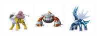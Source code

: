 \documentclass[12pt]{beamer}
\begin{document}
\begin{frame}
\begin{footnotesize}
\begin{block}{}
\begin{center}
    \includegraphics[width=1.5cm]{../../images/pokemon/raikou.png}
    \includegraphics[width=1.5cm]{../../images/pokemon/heatran.png}
    \includegraphics[width=1.5cm]{../../images/pokemon/dialga.png}
    \end{center}
\end{block}

\end{footnotesize}
\end{frame}


\end{document}
